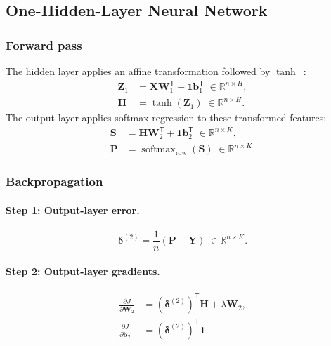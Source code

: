 \documentclass[sigconf,screen,nonacm]{acmart}
\newcommand{\R}{\mathbb{R}}
\newcommand{\1}{\mathbf{1}}
\newcommand{\vone}{\mathbf{1}}
\newcommand{\T}{\mathsf{T}}
\newcommand{\softmaxrow}{\operatorname{softmax}_{\mathrm{row}}}
\newcommand{\tanhact}{\operatorname{tanh}}
\newcommand{\vbone}{\mathbf{b}_1}
\newcommand{\vbtwo}{\mathbf{b}_2}
\newcommand{\mX}{\mathbf{X}}
\newcommand{\mY}{\mathbf{Y}}
\newcommand{\mH}{\mathbf{H}}
\newcommand{\mP}{\mathbf{P}}
\newcommand{\mS}{\mathbf{S}}
\newcommand{\mWone}{\mathbf{W}_1}
\newcommand{\mWtwo}{\mathbf{W}_2}
\newcommand{\mZ}{\mathbf{Z}}
\newcommand{\bdelta}{\boldsymbol{\delta}}
\begin{document}
\subsection{One-Hidden-Layer Neural Network}
\label{sec:nn}

\subsubsection*{Forward pass}

The hidden layer applies an affine transformation followed by $\tanh$~\cite{cs231n_nn1, cs229dlnotes}:
\begin{align}
  \mZ_1    &= \mX\mWone^\T + \vone\vbone^\T \;\in\R^{n\times H},
             \label{eq:nn_Z1}\\
  \mH      &= \tanhact(\mZ_1)                \;\in\R^{n\times H}.
             \label{eq:nn_A1}
\end{align}
The output layer applies softmax regression to these transformed features:
\begin{align}
  \mS      &= \mH\mWtwo^\T + \vone\vbtwo^\T \;\in\R^{n\times K},
             \label{eq:nn_S}\\
  \mP      &= \softmaxrow(\mS)               \;\in\R^{n\times K}.
             \label{eq:nn_P}
\end{align}

\subsubsection*{Backpropagation}

\paragraph{Step 1: Output-layer error.}
\begin{equation}\label{eq:nn_delta2}
  \bdelta^{(2)} = \frac{1}{n}(\mP - \mY) \;\in\R^{n\times K}.
\end{equation}

\paragraph{Step 2: Output-layer gradients.}
\begin{align}
  \frac{\partial J}{\partial \mWtwo} &=
    (\bdelta^{(2)})^\T\mH + \lambda\mWtwo, \label{eq:nn_dW2}\\[3pt]
  \frac{\partial J}{\partial \vbtwo} &=
    (\bdelta^{(2)})^\T\vone. \label{eq:nn_db2}
\end{align}
\end{document}
